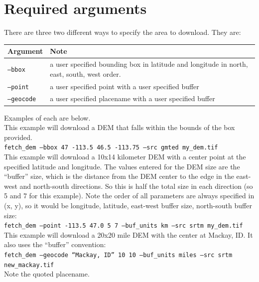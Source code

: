 \documentclass[12pt,oneside,final]{article}
\begin{document}
\section{Required arguments}
There are three two different ways to specify the area to download.  They are:
\medskip
\begin{center}
\begin{tabular}{| l | p{4.0in} |}
    \hline
    Argument & Note \\ \hline
    \texttt{--bbox} & a user specified bounding box in latitude and longitude
                       in north, east, south, west order.\\ \hline
    \texttt{--point} & a user specified point with a user specified buffer \\
                       \hline
    \texttt{--geocode} & a user specified placename with a user specified
                         buffer \\ \hline
\end{tabular}
\end{center}
Examples of each are below.\\

\noindent
This example will download a DEM that falls within the bounds of the box
provided.\\
\texttt{fetch\_dem --bbox 47 -113.5 46.5 -113.75 --src gmted my\_dem.tif}\\

\noindent
This example will download a 10x14 kilometer DEM with a center point at the
specified latitude and longitude.  The values entered for the DEM size are the 
``buffer'' size, which is the distance from the DEM center to the edge in the
east-west and north-south directions.  So this is half the total size in each
direction (so 5 and 7 for this example).  Note the order of all parameters are
always specified in (x, y), so it would be longitude, latitude, east-west buffer
size, north-south buffer size:\\
\texttt{fetch\_dem --point -113.5 47.0 5 7 --buf\_units km --src srtm my\_dem.tif}\\

\noindent
This example will download a 20x20 mile DEM with the center at Mackay, ID. It also
uses the ``buffer'' convention:\\
\texttt{fetch\_dem --geocode ``Mackay, ID'' 10 10 --buf\_units miles --src srtm
new\_mackay.tif}\\
Note the quoted placename.\\
\end{document}
